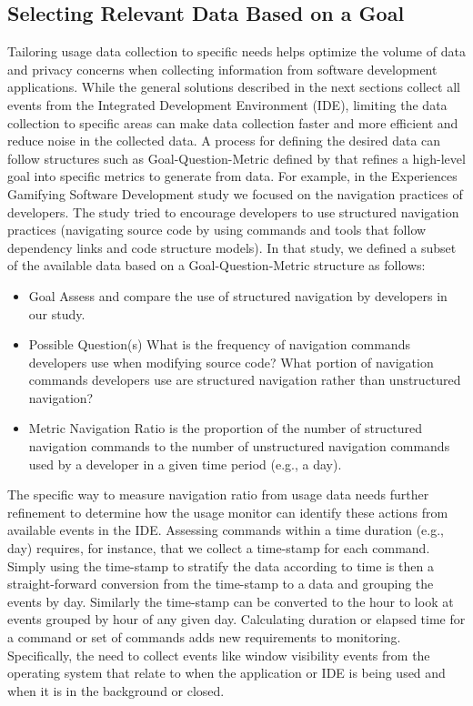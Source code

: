 \subsection{Selecting Relevant Data Based on a Goal}
\label{SelectingData}
Tailoring usage data collection to specific needs helps optimize the volume of data and privacy concerns when collecting information from software development applications.  While the general solutions described in the next sections collect all events from the Integrated Development Environment (IDE), limiting the data collection to specific areas can make data collection faster and more efficient and reduce noise in the collected data.  A process for defining the desired data can follow structures such as Goal-Question-Metric defined by \citet{basili-GQM}  that refines a high-level goal into specific metrics to generate from data.  For example, in the Experiences Gamifying Software Development \citep{SnipesExperiencesGamifyingSoftwareDevelopment} study we focused on the navigation practices of developers.  The study tried to encourage developers to use structured navigation practices (navigating source code by using commands and tools that follow dependency links and code structure models).  In that study, we defined a subset of the available data based on a Goal-Question-Metric structure as follows:
    \begin{itemize}
\item
	Goal
\subitem
	Assess and compare the use of structured navigation by developers in our study.
\item
	Possible Question(s)
\subitem
	What is the frequency of navigation commands developers use when modifying source code?
\subitem
	What portion of navigation commands developers use are structured navigation rather than unstructured navigation?
\item
	Metric
\subitem
	Navigation Ratio is the proportion of the number of structured navigation commands to the number of unstructured navigation commands used by a developer in a given time period (e.g., a day).

	    \end{itemize}

The specific way to measure navigation ratio from usage data needs further refinement to determine how the usage monitor can identify these actions from available events in the IDE. Assessing commands within a time duration (e.g., day) requires, for instance, that we collect a time-stamp for each command.  Simply using the time-stamp to stratify the data according to time is then a straight-forward conversion from the time-stamp to a data and grouping the events by day.
Similarly the time-stamp can be converted to the hour to look at events grouped by hour of any given day. Calculating duration or elapsed time for a command or set of commands adds new requirements to monitoring.  Specifically, the need to collect events like window visibility events from the operating system that relate to when the application or IDE is being used and when it is in the background or closed.


